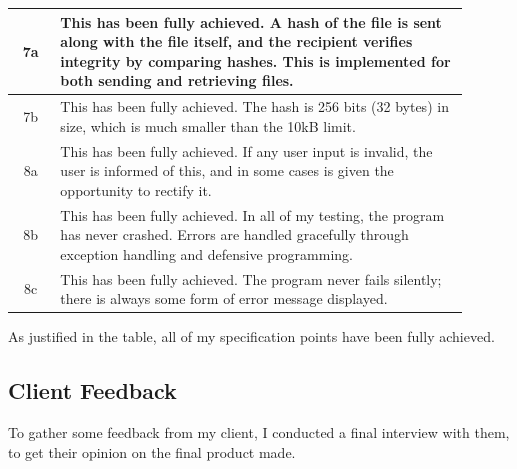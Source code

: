 \documentclass[../main.tex]{subfiles}
\begin{document}
\begin{longtable}{|c|p{0.9\linewidth}|}
7a & This has been fully achieved. A hash of the file is sent along with the file itself, and the recipient verifies integrity by comparing hashes. This is implemented for both sending and retrieving files. \\
\hline

7b & This has been fully achieved. The hash is 256 bits (32 bytes) in size, which is much smaller than the 10kB limit. \\
\hline

8a & This has been fully achieved. If any user input is invalid, the user is informed of this, and in some cases is given the opportunity to rectify it. \\
\hline

8b & This has been fully achieved. In all of my testing, the program has never crashed. Errors are handled gracefully through exception handling and defensive programming. \\
\hline

8c & This has been fully achieved. The program never fails silently; there is always some form of error message displayed. \\
\hline
\end{longtable}

As justified in the table, all of my specification points have been fully achieved.

\subsection{Client Feedback}

To gather some feedback from my client, I conducted a final interview with them, to get their opinion on the final product made. 
\end{document}
